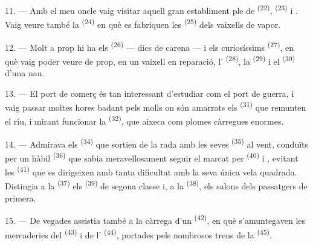 \VUsaut{3.0mm}
\VUsaut{3.0mm}

11. --- Amb el meu oncle vaig visitar aquell gran establiment ple de
 \textsuperscript{(22)},  \textsuperscript{(23)} i
. Vaig veure també la 
\textsuperscript{(24)} en què es fabriquen les 
\textsuperscript{(25)} dels vaixells de vapor.

12. --- Molt a prop hi ha els  \textsuperscript{(26)} --- dics de
carena --- i els curiosíssims  \textsuperscript{(27)}, en
què vaig poder veure de prop, en un vaixell en reparació, l'
\textsuperscript{(28)}, la  \textsuperscript{(29)} i el
 \textsuperscript{(30)} d'una nau.

13. --- El port de comerç és tan interessant d'estudiar com el port de guerra, i
vaig passar moltes hores badant pels molls on són amarrats els  \textsuperscript{(31)} que remunten el riu, i mirant funcionar la
 \textsuperscript{(32)}, que aixeca com plomes càrregues
enormes.

\VUsaut{4.0mm}
\VUsaut{3.0mm}

14. --- Admirava els  \textsuperscript{(34)} que sortien de
la rada amb les seves  \textsuperscript{(35)} al vent, conduïts
per un hàbil  \textsuperscript{(36)} que sabia meravellosament
seguir el  marcat per  \textsuperscript{(40)} i
, evitant les  \textsuperscript{(41)} que es
dirigeixen amb tanta dificultat amb la seva única vela quadrada. Distingia a la
 \textsuperscript{(37)} els 
\textsuperscript{(39)} de segona classe i, a la 
\textsuperscript{(38)}, els salons dels passatgers de primera.

15. --- De vegades assistia també a la càrrega d'un 
\textsuperscript{(42)}, en què s'amuntegaven les mercaderies del
 \textsuperscript{(43)} i de l'
\textsuperscript{(44)}, portades pels nombrosos trens de la  \textsuperscript{(45)}.

\VUsaut{3.0mm}
\VUsaut{3.0mm}

